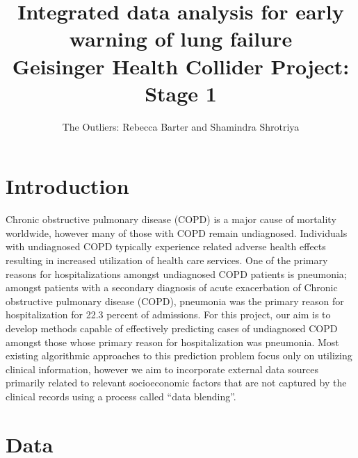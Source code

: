 \documentclass{article}
\title{Integrated data analysis for early warning of lung failure \\ \large{Geisinger Health Collider Project: Stage 1}}
\author{The Outliers: Rebecca Barter and Shamindra Shrotriya}
\begin{document}
\maketitle

\section{Introduction}

Chronic obstructive pulmonary disease (COPD) is a major cause of mortality worldwide, however many of those with COPD remain undiagnosed. Individuals with undiagnosed COPD typically experience related adverse health effects resulting in increased utilization of health care services. One of the primary reasons for hospitalizations amongst undiagnosed COPD patients is pneumonia; amongst patients with a secondary diagnosis of acute exacerbation of Chronic obstructive pulmonary disease (COPD), pneumonia was the primary reason for hospitalization for 22.3 percent of admissions. For this project, our aim is to develop methods capable of effectively predicting cases of undiagnosed COPD amongst those whose primary reason for hospitalization was pneumonia. Most existing algorithmic approaches to this prediction problem focus only on utilizing clinical information, however we aim to incorporate external data sources primarily related to relevant socioeconomic factors that are not captured by the clinical records using a process called ``data blending''. 

%


\section{Data}
\end{document}
